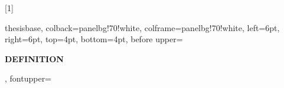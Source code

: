 %
[1]{%
  thesisbase, colback=panelbg!70!white, colframe=panelbg!70!white,
  left=6pt, right=6pt, top=4pt, bottom=4pt,
  before upper={{\sffamily\scriptsize\bfseries\color{quietink}%
    \MakeUppercase{definition}}\hspace{0.7em}{\bfseries #1}\par\vspace{0.4ex}},
  fontupper=\small}

